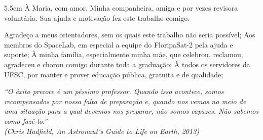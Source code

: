 \begin{dedicatoria}
	\vspace*{\fill}
	\noindent
	\begin{adjustwidth*}{}{5.5cm} 
		\raggedleft       
		À Maria, com amor. Minha companheira, amiga e por vezes revisora voluntária. Sua ajuda e motivação fez este trabalho comigo.
	\end{adjustwidth*}
\end{dedicatoria}

\begin{agradecimentos}
    Agradeço a meus orientadores, sem os quais este trabalho não seria possível;
    Aos membros do SpaceLab, em especial a equipe do FloripaSat-2 pela ajuda e suporte;
    À minha família, especialmente minha mãe, que celebrou, reclamou, agradeceu e chorou comigo durante toda a graduação;
    À todos os servidores da UFSC, por manter e prover educação pública, gratuita e de qualidade;
\end{agradecimentos}

\begin{epigrafe}
	\vspace*{\fill}
	\begin{flushright}
		\textit{``O êxito precoce é um péssimo professor. Quando isso acontece, somos
                  recompensados por nossa falta de preparação e, quando nos vemos
                  no meio de uma situação para a qual devemos nos preparar, não somos capazes. Não sabemos como fazê-lo.'' \\
			(Chris Hadfield, An Astronaut's Guide to Life on Earth, 2013)}
	\end{flushright}
\end{epigrafe}


